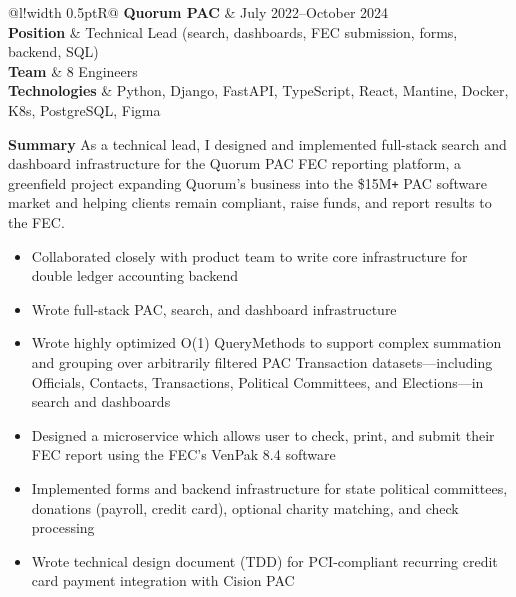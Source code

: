 \documentclass[]{article}
\newcommand\VRule{\color{lightgray}\vrule width 0.5pt}
\def\Plus{\texttt{+}}
\begin{document}

\begin{tabular}{@{}l!{\VRule}R@{}}
	{\bf Quorum PAC} & {\footnotesize July 2022--October 2024}\\
	\textbf{Position} & Technical Lead (search, dashboards, FEC submission, forms, backend, SQL)\\
	\textbf{Team} & 8 Engineers\\
	\textbf{Technologies} & Python, Django, FastAPI, TypeScript, React, Mantine, Docker, K8s, PostgreSQL, Figma \\
\end{tabular}

\textbf{Summary}
As a technical lead, I designed and implemented full-stack search and dashboard infrastructure for the Quorum PAC FEC reporting platform, a greenfield project expanding Quorum's business into the \$15M{\Plus} PAC software market and helping clients remain compliant, raise funds, and report results to the FEC.
\begin{itemize}
	\item Collaborated closely with product team to write core infrastructure for double ledger accounting backend
    \item Wrote full-stack PAC, search, and dashboard infrastructure
    \item Wrote highly optimized O(1) QueryMethods to support complex summation and grouping over arbitrarily filtered PAC Transaction datasets—including Officials, Contacts, Transactions, Political Committees, and Elections—in search and dashboards
    \item Designed a microservice which allows user to check, print, and submit their FEC report using the FEC's VenPak 8.4 software
    \item Implemented forms and backend infrastructure for state political committees, donations (payroll, credit card), optional charity matching, and check processing
	\item Wrote technical design document (TDD) for PCI-compliant recurring credit card payment integration with Cision PAC\\
\end{itemize}


\end{document}
